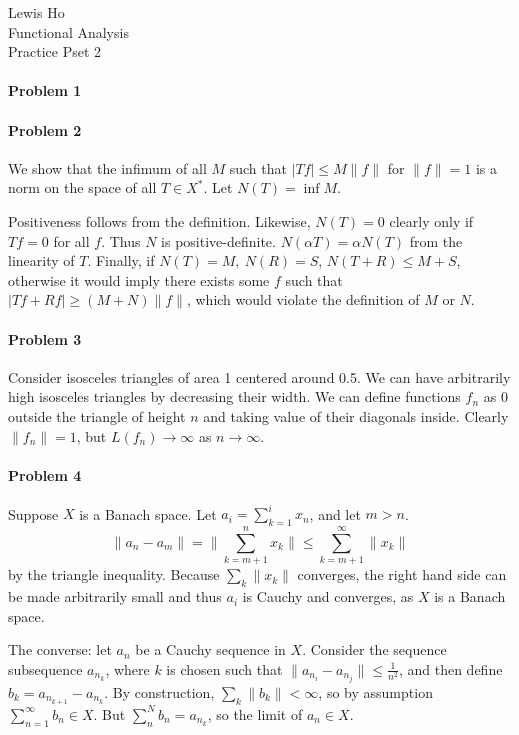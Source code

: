 \documentclass[12pt]{article}
\begin{document}
\begin{center}
  Lewis Ho\\
  Functional Analysis\\
  Practice Pset 2
\end{center}
\paragraph{Problem 1}

\paragraph{Problem 2}

We show that the infimum of all $M$ such that $|Tf| \leq M\|f\|$ for $\|f\| =
1$ is a norm on the space of all $T \in X^*$. Let $N(T) = \inf M$.

Positiveness follows from the definition. Likewise, $N(T) = 0$ clearly only if $Tf
= 0$ for all $f$. Thus $N$ is positive-definite. $N(\alpha T) = \alpha N(T)$
from the linearity of $T$. Finally, if $N(T) = M,\ N(R) = S$, $N(T+R) \leq M+S$,
otherwise it would imply there exists some $f$ such that $|Tf + Rf| \geq (M+N)
\|f\|$, which would violate the definition of $M$ or $N$.

\paragraph{Problem 3}

Consider isosceles triangles of area 1 centered around 0.5.
We can have arbitrarily high isosceles triangles by decreasing their width.
We can define functions $f_n$ as 0 outside the triangle of height $n$ and taking
value of their diagonals inside. Clearly $\|f_n\| = 1$, but $L(f_n) \to \infty$
as $n \to \infty$.

\paragraph{Problem 4}

Suppose $X$ is a Banach space. Let $a_i = \sum_{k=1}^ix_n$, and let $m > n$.
\begin{displaymath}
  \|a_n - a_m\| = \|\sum_{k=m+1}^nx_k\| \leq \sum_{k=m+1}^\infty\|x_k\|
\end{displaymath}
by the triangle inequality. Because $\sum_k\|x_k\|$ converges, the right hand
side can be made arbitrarily small and thus $a_i$ is Cauchy and converges, as
$X$ is a Banach space.

The converse: let $a_n$ be a Cauchy sequence in $X$. Consider the sequence
subsequence $a_{n_k}$, where $k$ is chosen such that $\|a_{n_i} - a_{n_j}\| \leq
\frac{1}{n^2}$, and then define $b_k = a_{n_{k+1}} - a_{n_{k}}$. By construction,
$\sum_k\|b_k\| < \infty$, so by assumption $\sum_{n=1}^\infty b_n \in X$.
But $\sum_n^Nb_n = a_{n_k}$, so the limit of $a_n \in X$.
\end{document}
